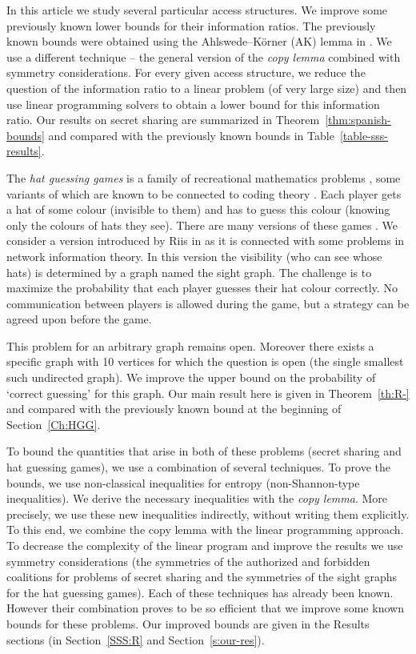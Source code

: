 \documentclass[11pt, a4paper]{kybernetika}
\begin{document}
	In this article we study several particular access structures. We improve some previously known lower bounds for their information ratios. The previously known bounds were obtained using the Ahlswede--K\"orner (AK) lemma in \cite{farras2020improving}. We use a different technique -- the general version of the \emph{copy lemma} \cite{zhang1998characterization} combined with symmetry considerations. For every given access structure, we reduce the question of the information ratio to a linear problem (of very large size) and then use linear programming solvers to obtain a lower bound for this information ratio. Our results on secret sharing are summarized in Theorem~\ref{thm:spanish-bounds} and compared with the previously known bounds in Table~\ref{table-sss-results}.
	
	The \emph{hat guessing games} is a family of recreational mathematics problems \cite{winkler2002games}, some variants of which are known to be connected to coding theory \cite{robinson2001mathematicians}. Each player gets a hat of some colour (invisible to them) and has to guess this colour (knowing only the colours of hats they see). There are many versions of these games \cite{butler2009hat,ma2011new}. We consider a version introduced by Riis in \cite{riis2006utilising,riis2007information} as it is connected with some problems in network information theory. In this version the visibility (who can see whose hats) is determined by a graph named the sight graph. The challenge is to maximize the probability that each player guesses their hat colour correctly. No communication between players is allowed during the game, but a strategy can be agreed upon before the game. 
	
	This problem for an arbitrary graph remains open. Moreover there exists a specific graph with 10 vertices for which the question is open (the single smallest such undirected graph). We improve the upper bound on the probability of `correct guessing' for this graph. Our main result here is given in Theorem~\ref{th:R-} and compared with the previously known bound at the beginning of Section~\ref{Ch:HGG}.
	
	To bound the quantities that arise in both of these problems (secret sharing and hat guessing games), we use a combination of several techniques. To prove the bounds, we use non-classical inequalities for entropy (non-Shannon-type inequalities). We derive the necessary inequalities with the \emph{copy lemma}. More precisely, we use these new inequalities indirectly, without writing them explicitly. To this end, we combine the copy lemma with the linear programming approach. To decrease the complexity of the linear program and improve the results we use symmetry considerations (the symmetries of the authorized and forbidden coalitions for problems of secret sharing and the symmetries of the sight graphs for the hat guessing games). Each of these techniques has already been known. However their combination proves to be so efficient that we improve some known bounds for these problems. Our improved bounds are given in the Results sections (in Section~\ref{SSS:R} and Section~\ref{s:our-res}).
	
\end{document}
